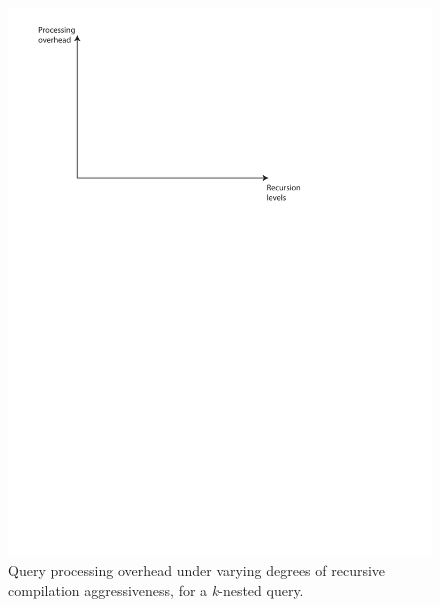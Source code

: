 {\begin{figure}
\includegraphics[scale=0.6]{figures/axes-rlevels.pdf}
\caption{Query processing overhead under varying degrees of recursive
compilation aggressiveness, for a \textit{k}-nested query.}
\label{fig:overhead-recursion-levels-nesting}
\end{figure}

}
